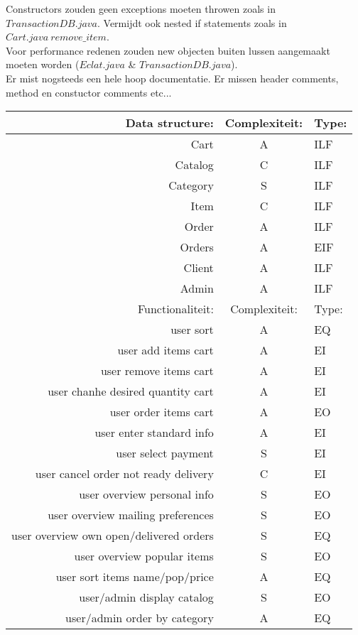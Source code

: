 \documentclass{article}
\begin{document}
Constructors zouden geen exceptions moeten throwen zoals in $TransactionDB.java$. Vermijdt ook nested if statements zoals in $Cart.java\ remove\_item$.\\
Voor performance redenen zouden new objecten buiten lussen aangemaakt moeten worden ($Eclat.java$ \& $TransactionDB.java$).\\
Er mist nogsteeds een hele hoop documentatie. Er missen header comments, method en constuctor comments etc...
\begin{table}
\begin{tabular}{|r|c|l|}
\hline
Data structure:	& Complexiteit:	& Type:	\\
\hline
Cart			& A 			& ILF 	\\
Catalog			& C 			& ILF 	\\
Category		& S 			& ILF	\\
Item			& C 			& ILF 	\\
Order			& A 			& ILF 	\\
Orders			& A 			& EIF 	\\
Client			& A 			& ILF 	\\
Admin			& A 			& ILF 	\\
\hline
\hline
Functionaliteit:							& Complexiteit:	& Type: \\
\hline
user sort									& A				& EQ	\\
user add items cart							& A				& EI	\\
user remove items cart						& A				& EI	\\
user chanhe desired quantity cart			& A				& EI	\\
user order items cart						& A				& EO	\\
user enter standard info					& A				& EI	\\
user select payment							& S				& EI	\\
user cancel order not ready delivery		& C				& EI	\\
user overview personal info					& S				& EO	\\
user overview mailing preferences			& S				& EO	\\
user overview own open/delivered orders		& S				& EQ	\\
user overview popular items					& S				& EO	\\
user sort items name/pop/price				& A				& EQ	\\
user/admin display catalog					& S				& EO	\\
user/admin order by category				& A				& EQ 	\\

\end{tabular}
\end{table}
\end{document}
